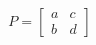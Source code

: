 \documentclass[preview]{standalone}
\begin{document}
\begin{align*}
P = \begin{bmatrix} a & c \\ b & d \end{bmatrix}
\end{align*}
\end{document}
